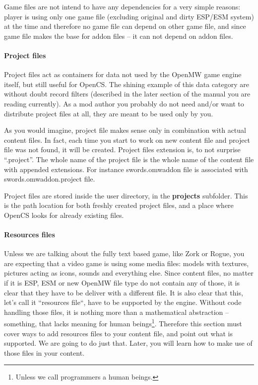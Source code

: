 Game files are not intend to have any dependencies for a very simple reasons: player is using only one game file (excluding original
and dirty ESP/ESM system) at the time and therefore no game file can depend on other game file, and since game file makes the base
for addon files -- it can not depend on addon files.

\paragraph{Project files}
Project files act as containers for data not used by the Open{MW} game engine itself, but still useful for OpenCS. The shining example
of this data category are without doubt record filters (described in the later section of the manual you are reading currently).
As a mod author you probably do not need and/or want to distribute project files at all, they are meant to be used only by you.

As you would imagine, project file makes sense only in combination with actual content files. In fact, each time you start to work
on new content file and project file was not found, it will be created.
Project files extension is, to not surprise ``.project''. The whole name of the project file is the whole name of the content file
with appended extensions. For instance swords.omwaddon file is associated with swords.omwaddon.project file.

Project files are stored inside the user directory, in the \textbf{projects} subfolder. This is the path location for both freshly
created project files, and a place where Open{CS} looks for already existing files.

\paragraph{Resources files}
Unless we are talking about the fully text based game, like Zork or Rogue, you are expecting that a video game is using some media files:
models with textures, pictures acting as icons, sounds and everything else. Since content files, no matter if it is ESP, ESM or new Open{MW}
file type do not contain any of those, it is clear that they have to be deliver with a different file. It is also clear that this,
let's call it ``resources file``, have to be supported by the engine. Without code handling those files, it is nothing more than
a mathematical abstraction -- something, that lacks meaning for human beings\footnote{Unless we call programmers a human beings.}.
Therefore this section must cover ways to add resources files to your content file, and point out what is supported. We are going
to do just that. Later, you will learn how to make use of those files in your content.

